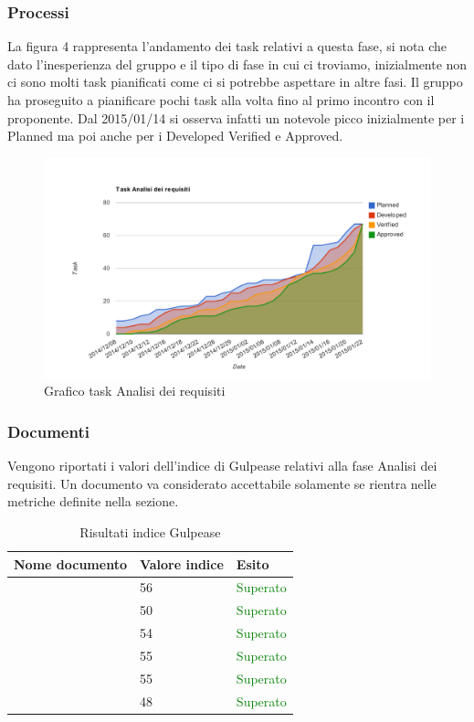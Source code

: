 		\subsubsection{Processi}
		La figura 4 rappresenta l'andamento dei task relativi a questa fase, si nota che dato l'inesperienza del gruppo e il tipo di fase in cui ci troviamo, inizialmente non ci sono molti task pianificati come ci si potrebbe aspettare in altre fasi. Il gruppo ha proseguito a pianificare pochi task alla volta fino al primo incontro con il proponente. Dal 2015/01/14 si osserva infatti un notevole picco inizialmente per i Planned ma poi anche per i Developed Verified e Approved. 
			\begin{figure}[htbp]
				\centering
				\centerline{\includegraphics[scale=1]{images/Grafico_fase_2.pdf}}
				\caption{Grafico task Analisi dei requisiti}
				\label{fig:taskfase2}
			\end{figure}
	 	\subsubsection{Documenti}
	 	Vengono riportati i valori dell'indice di Gulpease relativi alla fase Analisi dei requisiti. Un documento va considerato accettabile solamente se rientra nelle metriche definite nella sezione.
		\begin{table}[!ht]
			\begin{center}
				\begin{tabularx}{0.9\textwidth}{|l|l|X|}
					\hline
					\textbf{Nome documento} & \textbf{Valore indice} & \textbf{Esito}\\
					\hline						
					\docNameVersionAdR & 56 & \textcolor{green}{Superato}\\
					\hline
					\docNameVersionGlo & 50 & \textcolor{green}{Superato}\\
					\hline					
					\docNameVersionNdP & 54 & \textcolor{green}{Superato}\\
					\hline					
					\docNameVersionPdP & 55 & \textcolor{green}{Superato}\\
					\hline					
					\docNameVersionPdQ & 55 & \textcolor{green}{Superato}\\
					\hline					
					\docNameVersionSdF & 48 & \textcolor{green}{Superato}\\
					\hline				
				\end{tabularx}
			\end{center}
			\caption{Risultati indice Gulpease}
		\end{table}
